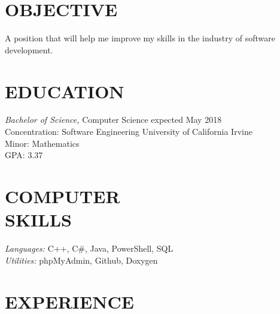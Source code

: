 \documentclass[margin, 10pt]{res} %
\begin{document}
\begin{resume}

 
\section{OBJECTIVE}

A position that will help me improve my skills in the industry of software development.


\section{EDUCATION}

{\sl Bachelor of Science,} Computer Science \hfill expected May 2018 \\
Concentration: Software Engineering \hfill University of California Irvine \\
Minor: Mathematics \\
GPA: 3.37
 

\section{COMPUTER \\ SKILLS} 

{\sl Languages:}
C++, C\#, Java, PowerShell, SQL
\\
{\sl Utilities:}
phpMyAdmin, Github, Doxygen
 
 
\section{EXPERIENCE}


\end{resume}
\end{document}
